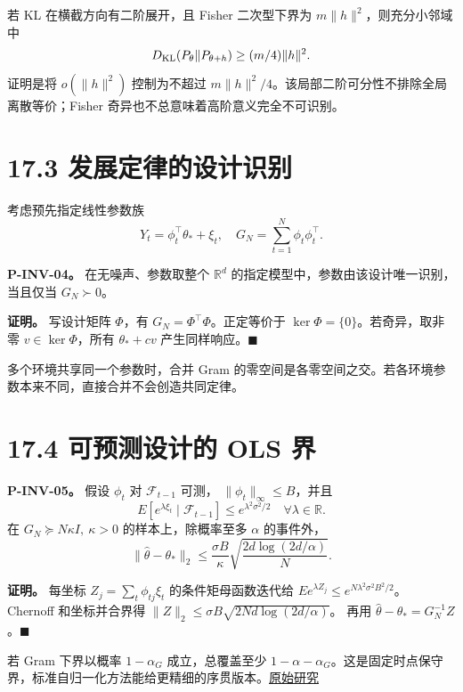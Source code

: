 \documentclass[
  11pt,
  oneside]{book}
\begin{document}
若 KL 在横截方向有二阶展开，且 Fisher 二次型下界为 \(m\|h\|^2\)，则充分小邻域中 \[D_{\rm KL}(P_\theta\|P_{\theta+h})\ge(m/4)\|h\|^2.\] 证明是将 \(o(\|h\|^2)\) 控制为不超过 \(m\|h\|^2/4\)。该局部二阶可分性不排除全局离散等价；Fisher 奇异也不总意味着高阶意义完全不可识别。

\section{17.3 发展定律的设计识别}\label{ux53d1ux5c55ux5b9aux5f8bux7684ux8bbeux8ba1ux8bc6ux522b}

考虑预先指定线性参数族 \[Y_t=\phi_t^\top\theta_*+\xi_t,\quad
G_N=\sum_{t=1}^N\phi_t\phi_t^\top.\]

\hypertarget{p-inv-04}{}\label{p-inv-04}

\textbf{P-INV-04。} 在无噪声、参数取整个 \(\mathbb R^d\) 的指定模型中，参数由该设计唯一识别，当且仅当 \(G_N\succ0\)。

\textbf{证明。} 写设计矩阵 \(\Phi\)，有 \(G_N=\Phi^\top\Phi\)。正定等价于 \(\ker\Phi=\{0\}\)。若奇异，取非零 \(v\in\ker\Phi\)，所有 \(\theta_*+cv\) 产生同样响应。\(\blacksquare\)

多个环境共享同一个参数时，合并 Gram 的零空间是各零空间之交。若各环境参数本来不同，直接合并不会创造共同定律。

\section{17.4 可预测设计的 OLS 界}\label{ux53efux9884ux6d4bux8bbeux8ba1ux7684-ols-ux754c}

\hypertarget{p-inv-05}{}\label{p-inv-05}

\textbf{P-INV-05。} 假设 \(\phi_t\) 对 \(\mathcal F_{t-1}\) 可测， \(\|\phi_t\|_\infty\le B\)，并且 \[E[e^{\lambda\xi_t}\mid\mathcal F_{t-1}]
\le e^{\lambda^2\sigma^2/2}
\quad\forall\lambda\in\mathbb R.\] 在 \(G_N\succeq N\kappa I,\ \kappa>0\) 的样本上，除概率至多 \(\alpha\) 的事件外， \[\|\widehat\theta-\theta_*\|_2
\le\frac{\sigma B}{\kappa}
\sqrt{\frac{2d\log(2d/\alpha)}N}.\]

\textbf{证明。} 每坐标 \(Z_j=\sum_t\phi_{tj}\xi_t\) 的条件矩母函数迭代给 \(E e^{\lambda Z_j}\le e^{N\lambda^2\sigma^2B^2/2}\)。 Chernoff 和坐标并合界得 \(\|Z\|_2\le\sigma B\sqrt{2Nd\log(2d/\alpha)}\)。 再用 \(\widehat\theta-\theta_*=G_N^{-1}Z\)。\(\blacksquare\)

若 Gram 下界以概率 \(1-\alpha_G\) 成立，总覆盖至少 \(1-\alpha-\alpha_G\)。这是固定时点保守界，标准自归一化方法能给更精细的序贯版本。\href{https://arxiv.org/abs/1102.2670}{原始研究}
\end{document}
